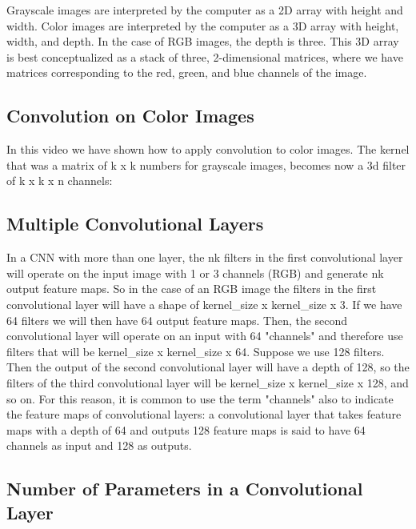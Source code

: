 Grayscale images are interpreted by the computer as a 2D array with height and width. Color images are interpreted by the computer as a 3D array with height, width, and depth. In the case of RGB images, the depth is three. This 3D array is best conceptualized as a stack of three, 2-dimensional matrices, where we have matrices corresponding to the red, green, and blue channels of the image.

\subsection{Convolution on Color Images}

In this video we have shown how to apply convolution to color images. The kernel that was a matrix of k x k numbers for grayscale images, becomes now a 3d filter of k x k x n channels:



\subsection{Multiple Convolutional Layers}

In a CNN with more than one layer, the nk filters in the first convolutional layer will operate on the input image with 1 or 3 channels (RGB) and generate nk output feature maps. So in the case of an RGB image the filters in the first convolutional layer will have a shape of kernel\_size x kernel\_size x 3. If we have 64 filters we will then have 64 output feature maps. Then, the second convolutional layer will operate on an input with 64 "channels" and therefore use filters that will be kernel\_size x kernel\_size x 64. Suppose we use 128 filters. Then the output of the second convolutional layer will have a depth of 128, so the filters of the third convolutional layer will be kernel\_size x kernel\_size x 128, and so on. For this reason, it is common to use the term "channels" also to indicate the feature maps of convolutional layers: a convolutional layer that takes feature maps with a depth of 64 and outputs 128 feature maps is said to have 64 channels as input and 128 as outputs.

\subsection{Number of Parameters in a Convolutional Layer}

